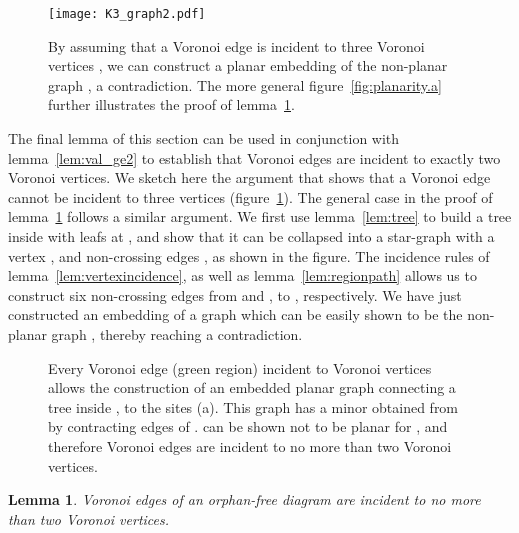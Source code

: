 \documentclass[11pt]{article}
\newtheorem{lemma}{Lemma}
\begin{document}
\begin{figure}[!h]
   \centering
\texttt{[image: K3\_graph2.pdf]}
   \caption{By assuming that a Voronoi edge  is incident to three Voronoi vertices , 
   		we can construct a planar embedding of the non-planar graph , a contradiction. 
		The more general figure~\ref{fig:planarity.a} 
			 further illustrates the proof of lemma~\ref{lem:val_le2}. }
\label{fig:K33}
\end{figure}

The final lemma of this section can be used in conjunction with lemma~\ref{lem:val_ge2} 
	to establish that Voronoi edges are incident to exactly two Voronoi vertices. 
We sketch here the argument that shows that a Voronoi edge  cannot 
	be incident to three vertices  (figure~\ref{fig:K33}). 
The general case in the proof of lemma~\ref{lem:val_le2} follows a similar argument. 
We first use lemma~\ref{lem:tree} to build a tree inside  with leafs at , 
	and show that it can be collapsed into a star-graph with a vertex , and non-crossing edges 
		, as shown in the figure. 
The incidence rules of lemma~\ref{lem:vertexincidence}, as well as lemma~\ref{lem:regionpath} allows us 
	to construct six non-crossing edges from  and , to , respectively. 
We have just constructed an embedding of a graph which can be easily shown to be the non-planar graph , 
	thereby reaching a contradiction. 







\begin{figure}[!h]
   \centering
	\quad\quad
   \caption{Every Voronoi edge  (green region) incident to  Voronoi vertices 
   			allows the construction of an embedded planar graph  connecting 
   			a tree  inside , to the sites  (a). 
		This graph has a minor  obtained from  by contracting edges of . 
		 can be shown not to be planar for , and therefore Voronoi edges are incident to no more than two Voronoi vertices. 
		 }
   \label{fig:planarity}
\end{figure}



\begin{lemma}\label{lem:val_le2}
Voronoi edges of an orphan-free diagram are incident to no more than two Voronoi vertices.
\end{lemma}
\end{document}
